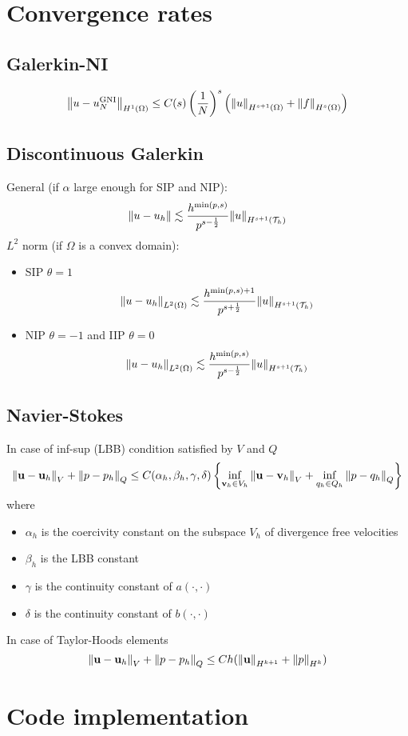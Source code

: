 \documentclass[a4paper,11pt]{article}
\theoremstyle{break}
\newcommand{\vect}[1]{\textbf{#1}}
\newcommand*{\txt}[1]{\text{#1}}
\newcommand{\ltwonorm}[1]{\norm{#1}_{L^2(\Omega)}}
\newcommand{\triangulation}{\mathcal{T}_h}
\newcommand{\onehalf}{\frac{1}{2}}
\newcommand{\bilinear}{a(\cdot, \cdot)}
\newcommand{\uvec}{\vect{u}}
\newcommand{\vvec}{\vect{v}}
\numberwithin{equation}{section}
\begin{document}
\section*{Convergence rates}
\subsection*{Galerkin-NI}
\[
    \norm{u-u_N^{\txt{GNI}}}_{H^1(\Omega)} \leq C(s) \left(\frac{1}{N}\right)^s \left(\norm{u}_{H^{s+1}(\Omega)}+\norm{f}_{H^s(\Omega)}\right)
\]
\subsection*{Discontinuous Galerkin}
General (if \(\alpha\) large enough for SIP and NIP):
\[
    \norm{u-u_h} \lesssim \frac{h^{\min(p,s)}}{p^{s-\onehalf}}\norm{u}_{H^{s+1}(\triangulation)}
\]
\(L^2\) norm (if \(\Omega\) is a convex domain):
\begin{itemize}
    \item SIP \(\theta = 1\)
    \[
        \ltwonorm{u-u_h} \lesssim \frac{h^{\min(p,s)+1}}{p^{s+\onehalf}}\norm{u}_{H^{s+1}(\triangulation)}
    \]
    \item NIP \(\theta = -1\) and IIP \(\theta = 0\)
    \[
        \ltwonorm{u-u_h} \lesssim \frac{h^{\min(p,s)}}{p^{s-\onehalf}}\norm{u}_{H^{s+1}(\triangulation)}
    \]
\end{itemize}
\subsection*{Navier-Stokes}
In case of inf-sup (LBB) condition satisfied by \(V\) and \(Q\)
\[
    \norm{\uvec-\uvec_h}_V + \norm{{p}-{p}_h}_Q \leq C(\alpha_h, \beta_h, \gamma, \delta)\left\{ \inf_{\vvec_h \in V_h}\norm{\uvec-\vvec_h}_V + \inf_{{q}_h \in Q_h}\norm{{p}-{q}_h}_Q \right\}
\]
where 
\begin{itemize}
    \item \(\alpha_h\) is the coercivity constant on the subspace \(V_h\) of divergence free velocities
    \item \(\beta_h\) is the LBB constant 
    \item \(\gamma\) is the continuity constant of \(\bilinear\)
    \item \(\delta\) is the continuity constant of \(b(\cdot,\cdot)\)
\end{itemize}
In case of Taylor-Hoods elements 
\[
    \norm{\uvec-\uvec_h}_V + \norm{{p}-{p}_h}_Q \leq Ch(\norm{\uvec}_{H^{k+1}} + \norm{p}_{H^k})
\]
\section*{Code implementation}
\end{document}
